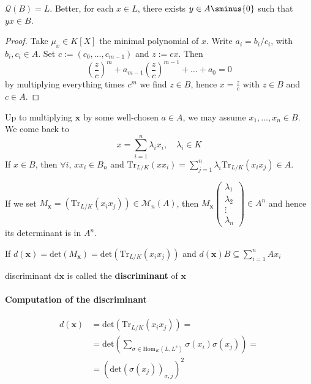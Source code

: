 \begin{lemma}{}
    \(\mathcal{Q}{(B)} = L\). Better, for each \(x \in L\), there exists \(y \in
    A \sminus \{0\} \) such that \(yx \in B\).
\end{lemma}
\begin{proof}{}
    Take \(\mu_x \in K[X]\) the minimal polynomial of \(x\). Write \(a_{i} =
    b_{i} / c_{i}\), with \(b_{i}, c_{i} \in A\). Set \(c := {(c_{0}, \dots,
    c_{m-1} )}\) and \(z := cx\). Then
    \[
      {\left( \frac{z}{c} \right)}^{m} + a_{m-1} {\left( \frac{z}{c} \right)}
      ^{m-1} + \dots + a_{0} = 0
    \]
    by multiplying everything times \(c^{m}\) we find \(z \in B\), hence \(x =
    \frac{z}{c}\) with \(z \in B\) and \(c \in A\).
\end{proof}

Up to multiplying \(\mathbf{x} \) by some well-chosen \(a \in A\), we may assume
\(x_{1}, \dots, x_{n} \in B\). We come back to 
\[
  x = \sum_{i=1}^{n} \lambda_{i} x_{i}, \quad \lambda_{i} \in K 
\]
If \(x \in B\), then \(\forall i\), \(x x_{i} \in B_n\) and \(\mathrm{Tr}_{L /
K} {(x x_{i})} = \sum_{j=1}^{n} \lambda_{i} \mathrm{Tr}_{L / K} {(x_{i} x_{j})}
\in A\).

If we set \(M_{\mathbf{x} } = {\left( \mathrm{Tr}_{L / K} {(x_{i}x_{j})}
\right)} \in \mathcal{M}_n{(A)} \), then \(M_{\mathbf{x} } \begin{pmatrix}
    \lambda_{1} \\
    \lambda_{2} \\
    \vdots \\
    \lambda_n
\end{pmatrix} \in A^{n}\) and hence its determinant is in \(A^{n}\).

\begin{proposition}{}
    If \(d{(\mathbf{x} )} = \mathrm{det}{(M_{\mathbf{x} } )} =
    \mathrm{det}{\left( \mathrm{Tr}_{L / K} {(x_{i}x_{j})} \right)} \) and
    \(d{(\mathbf{x} )} B \subseteq \sum_{i=1}^{n} Ax_{i}  \) 
\end{proposition}

\begin{definition}{discriminant}
    d\(\mathbf{x} \) is called the \textbf{discriminant} of \(\mathbf{x} \) 
\end{definition}

\paragraph{Computation of the discriminant}
\begin{align*}{}
    d{(\mathbf{x} )} &= \mathrm{det}{\left( \mathrm{Tr}_{L / K} {(x_{i}x_{j})}
    \right)} = \\
                     &= \mathrm{det} {\left( \sum_{\sigma \in
                     \mathrm{Hom}_K{(L, L^{s})}} \sigma{(x_{i})}\sigma{(x_{j})}
             \right)} =\\
                     &= {\left( \mathrm{det}{(\sigma {(x_{j})})}_{\sigma, j}
                     \right)}^2
\end{align*}

